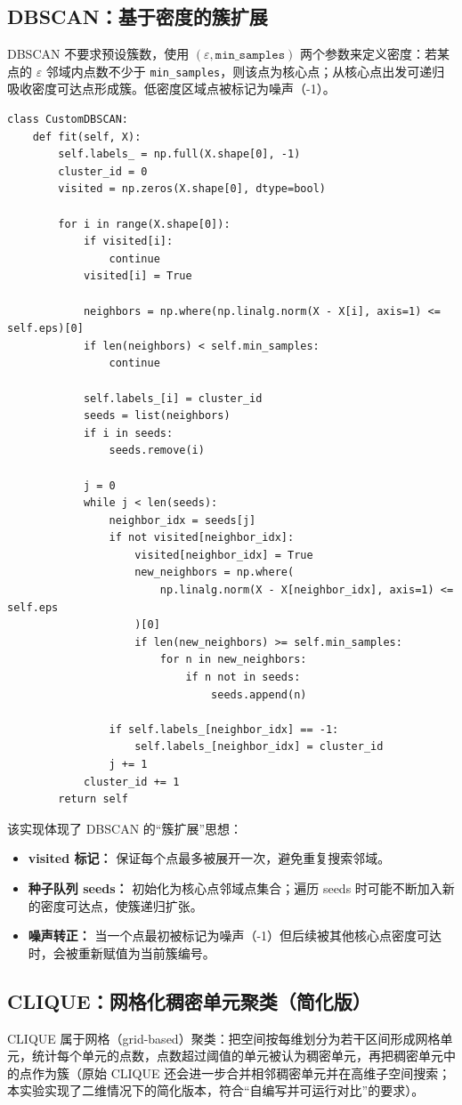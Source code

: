\documentclass[runningheads]{ctexart}
\begin{document}
\subsection{DBSCAN：基于密度的簇扩展}
DBSCAN 不要求预设簇数，使用 $(\varepsilon, \texttt{min\_samples})$ 两个参数来定义密度：若某点的 $\varepsilon$ 邻域内点数不少于 \texttt{min\_samples}，则该点为核心点；从核心点出发可递归吸收密度可达点形成簇。低密度区域点被标记为噪声（-1）。

\begin{lstlisting}
class CustomDBSCAN:
	def fit(self, X):
		self.labels_ = np.full(X.shape[0], -1)
		cluster_id = 0
		visited = np.zeros(X.shape[0], dtype=bool)

		for i in range(X.shape[0]):
			if visited[i]:
				continue
			visited[i] = True

			neighbors = np.where(np.linalg.norm(X - X[i], axis=1) <= self.eps)[0]
			if len(neighbors) < self.min_samples:
				continue

			self.labels_[i] = cluster_id
			seeds = list(neighbors)
			if i in seeds:
				seeds.remove(i)

			j = 0
			while j < len(seeds):
				neighbor_idx = seeds[j]
				if not visited[neighbor_idx]:
					visited[neighbor_idx] = True
					new_neighbors = np.where(
						np.linalg.norm(X - X[neighbor_idx], axis=1) <= self.eps
					)[0]
					if len(new_neighbors) >= self.min_samples:
						for n in new_neighbors:
							if n not in seeds:
								seeds.append(n)

				if self.labels_[neighbor_idx] == -1:
					self.labels_[neighbor_idx] = cluster_id
				j += 1
			cluster_id += 1
		return self
\end{lstlisting}

该实现体现了 DBSCAN 的“簇扩展”思想：
\begin{itemize}
	\item \textbf{visited 标记：} 保证每个点最多被展开一次，避免重复搜索邻域。
	\item \textbf{种子队列 seeds：} 初始化为核心点邻域点集合；遍历 seeds 时可能不断加入新的密度可达点，使簇递归扩张。
	\item \textbf{噪声转正：} 当一个点最初被标记为噪声（-1）但后续被其他核心点密度可达时，会被重新赋值为当前簇编号。
\end{itemize}

\subsection{CLIQUE：网格化稠密单元聚类（简化版）}
CLIQUE 属于网格（grid-based）聚类：把空间按每维划分为若干区间形成网格单元，统计每个单元的点数，点数超过阈值的单元被认为稠密单元，再把稠密单元中的点作为簇（原始 CLIQUE 还会进一步合并相邻稠密单元并在高维子空间搜索；本实验实现了二维情况下的简化版本，符合“自编写并可运行对比”的要求）。
\end{document}
